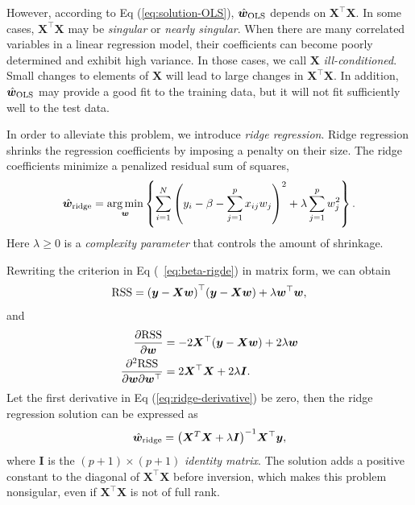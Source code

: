 However, according to Eq (\ref{eq:solution-OLS}), \(\hat{\bm{w}}_{\text{OLS}}\) depends on \(\bm{X}^\top\bm{X}\). 
In some cases, \(\bm{X}^\top\bm{X}\) may be \emph{singular} or \emph{nearly singular}. 
When there are many correlated variables in a linear regression model, their coefficients can become poorly determined and
exhibit high variance. In those cases, we call \(\bm{X}\) \emph{ill-conditioned}.
Small changes to elements of \(\bm{X}\) will lead to large changes in \(\bm{X}^\top\bm{X}\). In addition, \(\hat{\bm{w}}_{\text{OLS}}\) may provide a 
good fit to the training data, but it will not fit sufficiently well to the test data.

In order to alleviate this problem, we introduce \emph{ridge regression}. Ridge regression shrinks the regression coefficients by imposing a penalty 
on their size. The ridge coefficients minimize a penalized residual sum of squares,
\begin{equation}\label{eq:beta-rigde}
    \hat{\bm{w}}_{\text{ridge}} = \mathop{\arg\min}_{\bm{w}} \left\{
        \sum_{i=1}^N {\left(y_i - \beta - \sum_{j=1}^p x_{ij} w_j \right)}^2 + \lambda \sum_{j=1}^p w_j^2
    \right\}. 
\end{equation}
Here \(\lambda \ge 0\) is a \emph{complexity parameter} that controls the amount of shrinkage.

Rewriting the criterion in Eq (~\ref{eq:beta-rigde}) in matrix form, we can obtain
\begin{equation}
    \mathrm{RSS} = {(\bm{y} - \bm{Xw})}^\top (\bm{y} - \bm{Xw}) + \lambda \bm{w}^\top \bm{w},
\end{equation}
and
\begin{equation}\label{eq:ridge-derivative}
    \begin{aligned}
        \pdv{\mathrm{RSS}}{\bm{w}} &= -2\bm{X}^\top (\bm{y} - \bm{Xw}) + 2\lambda\bm{w}\\
        \pdv{\mathrm{RSS}}{\bm{w}}{\bm{w}^\top} &= 2\bm{X}^\top\bm{X} + 2\lambda \bm{I}.
    \end{aligned}
\end{equation}
Let the first derivative in Eq (\ref{eq:ridge-derivative}) be zero, then the ridge regression solution can be expressed as 
\begin{equation}
    \hat{\bm{w}}_{\text{ridge}} = {\left( \bm{X}^T \bm{X} + \lambda \bm{I} \right)}^{-1} \bm{X}^\top \bm{y},
\end{equation}
where \(\bm{I}\) is the \((p+1) \times (p+1)\) \emph{identity matrix}.
The solution adds a positive constant to the diagonal of \(\bm{X}^\top \bm{X}\) before inversion, which makes this problem
nonsigular, even if \(\bm{X}^\top \bm{X}\) is not of full rank.

